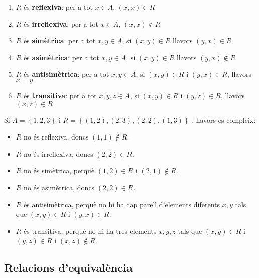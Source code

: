 \begin{enumerate}
\item $R$ \'{e}s \textbf{reflexiva}: per a tot $x\in A$, $(x,x)\in R$

\item $R$ \'{e}s \textbf{irreflexiva}: per a tot $x\in A$, $(x,x)\notin R$

\item $R$ \'{e}s \textbf{sim\`{e}trica}: per a tot $x,y\in A$, si $(x,y)\in R
$ llavors $(y,x)\in R$

\item $R$ \'{e}s \textbf{asim\`{e}trica}: per a tot $x,y\in A$, si $(x,y)\in
R$ llavors $(y,x)\notin R$

\item $R$ \'{e}s \textbf{antisim\`{e}trica}: per a tot $x,y\in A$, si $%
(x,y)\in R $ i $(y,x)\in R$, llavors $x=y$

\item $R$ \'{e}s \textbf{transitiva}: per a tot $x,y,z\in A$, si $(x,y)\in R$
i $(y,z)\in R$, llavors $(x,z)\in R$
\end{enumerate}

\begin{exem}
Si $A=\left\{ 1,2,3\right\} $ i $R=\left\{ (1,2),(2,3),(2,2),(1,3)\right\} $%
, llavors es compleix:

\begin{itemize}
\item $R$ no \'{e}s reflexiva, doncs $(1,1)\notin R$.

\item $R$ no \'{e}s irreflexiva, doncs $(2,2)\in R$.

\item $R$ no \'{e}s sim\`{e}trica, perqu\`{e} $(1,2)\in R$ i $(2,1)\notin R$.

\item $R$ no \'{e}s asim\`{e}trica, doncs $(2,2)\in R$.

\item $R$ \'{e}s antisim\`{e}trica, perqu\`{e} no hi ha cap parell
d'elements diferents $x,y$ tals que $(x,y)\in R$ i $(y,x)\in R$.

\item $R$ \'{e}s transitiva, perqu\`{e} no hi ha tres elements $x,y,z$ tals
que $(x,y)\in R$ i $(y,z)\in R$ i $(x,z)\notin R$.
\end{itemize}
\end{exem}

\subsection{Relacions d'equival\`{e}ncia}

